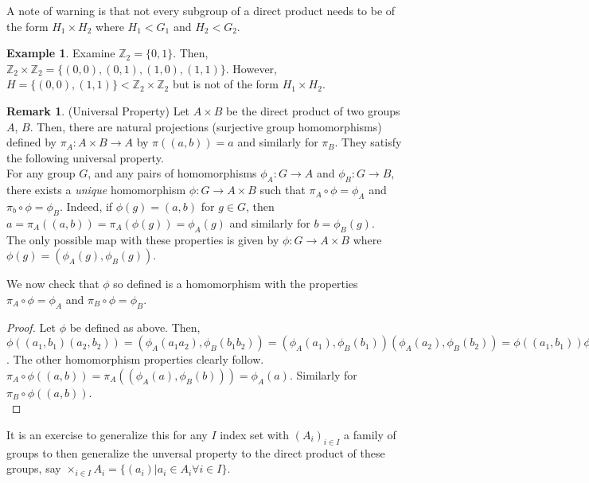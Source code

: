 \documentclass[11pt,leqno,oneside]{amsart}
\newcommand{\Z}{{\mathbb Z}} %
\newcommand{\subgroup}{\mathrel{<}}
\theoremstyle{definition}
\newtheorem*{example*}{Example}
\newtheorem{rmk}[thm]{Remark}
\numberwithin{equation}{section}
\begin{document}
A note of warning is that not every subgroup of a direct product needs to be
of the form $H_1 \times H_2$ where $H_1 \subgroup G_1$ and $H_2 \subgroup G_2$.

\begin{example*}
    Examine $\Z_2 = \{0,1\}$. Then, $\Z_2 \times \Z_2 =
    \{(0,0),(0,1),(1,0),(1,1)\}$.  However, $H = \{(0,0),(1,1)\} \subgroup \Z_2
    \times \Z_2$ but is not of the form $H_1 \times H_2$.
\end{example*}

\begin{rmk}
    (Universal Property) Let $A \times B$ be the direct product of two groups
    $A$, $B$. Then, there are natural projections (surjective group
    homomorphisms) defined by $\pi_A: A \times B \to A$ by $\pi( (a,b) ) = a$
    and similarly for $\pi_B$. They satisfy the following universal property. \\

    For any group $G$, and any pairs of homomorphisms $\phi_A: G \to A$ and
    $\phi_B: G \to B$, there exists a \emph{unique} homomorphism $\phi: G \to A
    \times B$ such that $\pi_A \circ \phi = \phi_A$ and $\pi_b \circ \phi =
    \phi_B$. Indeed, if $\phi(g) = (a,b)$ for $g \in G$, then $a = \pi_A( (a,b)
    ) = \pi_A(\phi(g)) = \phi_A(g)$ and similarly for $b = \phi_B(g)$. \\

    The only possible map with these properties is given by $\phi: G \to A
    \times B$ where $\phi(g) = (\phi_A(g), \phi_B(g))$.

    We now check that $\phi$ so defined is a homomorphism with the properties
    $\pi_A \circ \phi = \phi_A$ and $\pi_B \circ \phi = \phi_B$.
\end{rmk}
\begin{proof}
    Let $\phi$ be defined as above. Then, $\phi( (a_1,b_1)(a_2,b_2) ) =
    (\phi_A(a_1a_2), \phi_B(b_1b_2)) =
    (\phi_A(a_1),\phi_B(b_1))(\phi_A(a_2),\phi_B(b_2)) = \phi( (a_1,b_1) )\phi(
    (a_2,b_2) )$. The other homomorphism properties clearly follow. \\

    $\pi_A \circ \phi( (a,b) ) = \pi_A( (\phi_A(a), \phi_B(b)) ) = \phi_A(a)$.
    Similarly for $\pi_B \circ \phi( (a,b))$. \\
\end{proof}
It is an exercise to generalize this for any $I$ index set with $(A_i)_{i \in
I}$ a family of groups to then generalize the unversal property to the direct
product of these groups, say $\times_{i \in I} A_i = \{(a_i) | a_i \in A_i
\forall i \in I\}$. \\
\end{document}
